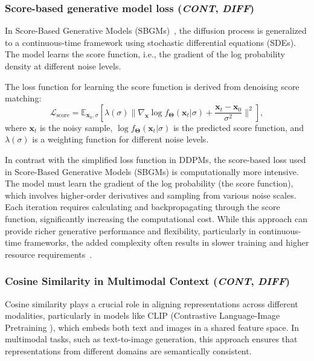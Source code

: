 \documentclass[sn-mathphys-num]{sn-jnl}%
\newcommand \cont{\textit{CONT}}
\newcommand \diff{\textit{DIFF}}
\renewcommand\vec{\mathbf}
\begin{document}
\subsubsection{Score-based generative model loss (\cont, \diff)}\label{subsubsec-sb_model_loss}
In Score-Based Generative Models (SBGMs)~\cite{song2020score}, the diffusion process is generalized to a continuous-time framework using stochastic differential equations (SDEs). The model learns the score function, i.e., the gradient of the log probability density at different noise levels.

The loss function for learning the score function is derived from denoising score matching:
\begin{equation}
    \mathcal{L}_{\text{score}} = \mathbb{E}_{\mathbf{x}_0, \sigma} \left[ \lambda(\sigma) \| \nabla_{\mathbf{x}} \log f_\vec{\Theta}(\mathbf{x}_t | \sigma) + \frac{\mathbf{x}_t - \mathbf{x}_0}{\sigma^2} \|^2 \right],
\end{equation}
where $\mathbf{x}_t$ is the noisy sample, $\log f_\vec{\Theta}(\mathbf{x}_t | \sigma)$ is the predicted score function, and $\lambda(\sigma)$ is a weighting function for different noise levels.

In contrast with the simplified loss function in DDPMs, the score-based loss used in Score-Based Generative Models (SBGMs) is computationally more intensive. The model must learn the gradient of the log probability (the score function), which involves higher-order derivatives and sampling from various noise scales. Each iteration requires calculating and backpropagating through the score function, significantly increasing the computational cost. While this approach can provide richer generative performance and flexibility, particularly in continuous-time frameworks, the added complexity often results in slower training and higher resource requirements~\cite{song2020score}.


\subsubsection{Cosine Similarity in Multimodal Context (\cont, \diff)}\label{subsubsec-generative_clip_loss}
Cosine similarity plays a crucial role in aligning representations across different modalities, particularly in models like CLIP (Contrastive Language-Image Pretraining \cite{radford2021learning}), which embeds both text and images in a shared feature space. In multimodal tasks, such as text-to-image generation, this approach ensures that representations from different domains are semantically consistent.
\end{document}

